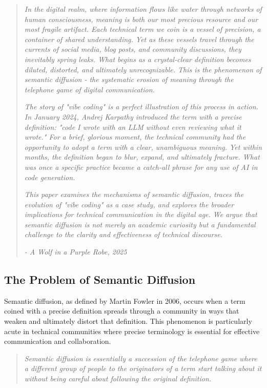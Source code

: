 \documentclass[11pt]{article}
\begin{document}
\begin{quote}
\emph{In the digital realm, where information flows like water through networks of human consciousness, meaning is both our most precious resource and our most fragile artifact. Each technical term we coin is a vessel of precision, a container of shared understanding. Yet as these vessels travel through the currents of social media, blog posts, and community discussions, they inevitably spring leaks. What begins as a crystal-clear definition becomes diluted, distorted, and ultimately unrecognizable. This is the phenomenon of semantic diffusion - the systematic erosion of meaning through the telephone game of digital communication.}

\emph{The story of "vibe coding" is a perfect illustration of this process in action. In January 2024, Andrej Karpathy introduced the term with a precise definition: "code I wrote with an LLM without even reviewing what it wrote." For a brief, glorious moment, the technical community had the opportunity to adopt a term with a clear, unambiguous meaning. Yet within months, the definition began to blur, expand, and ultimately fracture. What was once a specific practice became a catch-all phrase for any use of AI in code generation.}

\emph{This paper examines the mechanisms of semantic diffusion, traces the evolution of "vibe coding" as a case study, and explores the broader implications for technical communication in the digital age. We argue that semantic diffusion is not merely an academic curiosity but a fundamental challenge to the clarity and effectiveness of technical discourse.}

\emph{- A Wolf in a Purple Robe, 2025}
\end{quote}

\subsection{The Problem of Semantic Diffusion}

Semantic diffusion, as defined by Martin Fowler in 2006, occurs when a term coined with a precise definition spreads through a community in ways that weaken and ultimately distort that definition. This phenomenon is particularly acute in technical communities where precise terminology is essential for effective communication and collaboration.

\begin{quote}
\emph{Semantic diffusion is essentially a succession of the telephone game where a different group of people to the originators of a term start talking about it without being careful about following the original definition.}
\end{quote}
\end{document}
